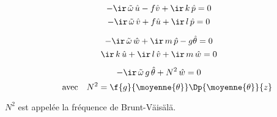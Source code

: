\begin{minipage}{.32\linewidth}
\begin{equation}\label{polau}
- \ir \, \tilde{\omega} \, \hat{u}
- f \hat{v}
+ \ir \, k \, \hat{p} 
= 0
\end{equation}
\begin{equation}\label{polav}
- \ir \, \tilde{\omega} \, \hat{v}
+ f \hat{u}
+ \ir \, l \, \hat{p} 
= 0
\end{equation}
\end{minipage}
\begin{minipage}{.32\linewidth}
\begin{equation}\label{polaw} 
- \ir \, \tilde{\omega} \, \hat{w}
+ \ir \, m \, \hat{p} 
- g \hat{\theta}
= 0
\end{equation}
\begin{equation}\label{poladiv}
\ir \, k \, \hat{u}
+ \ir \, l \, \hat{v}
+ \ir \, m \, \hat{w}
= 0
\end{equation}
\end{minipage}
\begin{minipage}{.32\linewidth}
\begin{equation}\label{polat}
- \ir \, \tilde{\omega} \, g \, \hat{\theta}
+ N^2 \, \hat{w}
= 0
\end{equation}
$$ \qquad \textrm{avec} \quad N^2 = \f{g}{\moyenne{\theta}} \Dp{\moyenne{\theta}}{z}$$ %
\end{minipage}

\sk
$N^2$ est appelée la fréquence de Brunt-V{\"a}is{\"a}l{\"a}.

